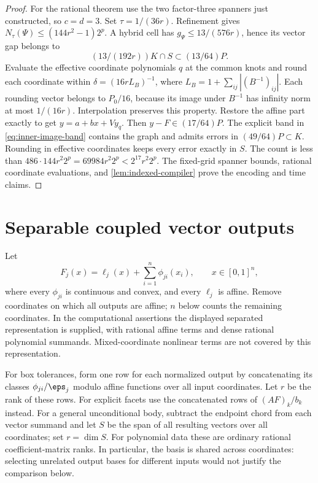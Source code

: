 \begin{proof}
For the rational theorem use the two factor-three spanners just
constructed, so $c=d=3$. Set $\tau=1/(36r)$. Refinement gives
$N_\tau(\Psi)\le(144r^2-1)2^p$. A hybrid cell has
$g_\Psi\le13/(576r)$, hence its vector gap belongs to
\[
 (13/(192r))K\cap S\subset(13/64)P.
\]
Evaluate the effective coordinate polynomials $q$ at the common knots
and round each coordinate within
$\delta=(16rL_B)^{-1}$, where
$L_B=1+\sum_{ij}|(B^{-1})_{ij}|$.
Each rounding vector belongs to $P_0/16$, because its image under
$B^{-1}$ has infinity norm at most $1/(16r)$. Interpolation preserves
this property. Restore the affine part exactly to get
$y=a+bx+Vy_q$. Then $y-F\in(17/64)P$.
The explicit band in \eqref{eq:inner-image-band} contains the graph
and admits errors in $(49/64)P\subset K$.
Rounding in effective coordinates keeps every error exactly in $S$.
The count is less than
$486\cdot144r^2 2^p=69984r^2 2^p<2^{17}r^2 2^p$.
The fixed-grid spanner bounds, rational coordinate evaluations, and
\cref{lem:indexed-compiler} prove the encoding and time claims.
\end{proof}

\section{Separable coupled vector outputs}\label{sec:separable-vector}

Let
\begin{equation}\label{eq:separable-vector-model}
 F_j(x)=\ell_j(x)+\sum_{i=1}^n\phi_{ji}(x_i),
 \qquad x\in[0,1]^n,
\end{equation}
where every $\phi_{ji}$ is continuous and convex, and every $\ell_j$
is affine. Remove coordinates on which all outputs are affine; $n$
below counts the remaining coordinates. In the computational assertions
the displayed separated representation is supplied, with rational affine
terms and dense rational polynomial summands. Mixed-coordinate nonlinear
terms are not covered by this representation.

For box tolerances, form one row for each normalized output by concatenating
its classes $\phi_{ji}/\eps_j$ modulo affine functions over all input
coordinates. Let $r$ be the rank of these rows. For explicit facets use
the concatenated rows of $(AF)_k/b_k$ instead. For a general unconditional
body, subtract the endpoint chord from each vector summand and let $S$
be the span of all resulting vectors over all coordinates; set $r=\dim S$.
For polynomial data these are ordinary rational coefficient-matrix ranks.
In particular, the basis is shared across coordinates: selecting unrelated
output bases for different inputs would not justify the comparison below.

